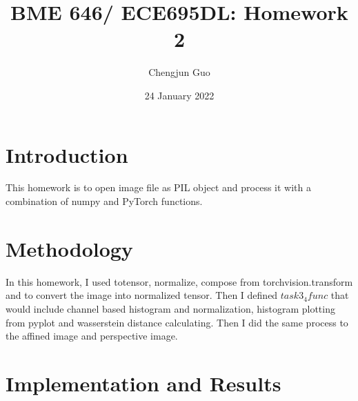 \documentclass{article}
\title{BME 646/ ECE695DL: Homework 2}
\author{Chengjun Guo}
\date{24 January 2022}
\begin{document}
\maketitle
\section{Introduction}
This homework is to open image file as PIL object and process it with a combination of numpy and PyTorch functions.
\section{Methodology}
In this homework, I used totensor, normalize, compose from torchvision.transform and to convert the image into normalized tensor. Then I defined $task3_4func$ that would include channel based histogram and normalization, histogram plotting from pyplot and wasserstein distance calculating. Then I did the same process to the affined image and perspective image.

\section{Implementation and Results}
\end{document}
